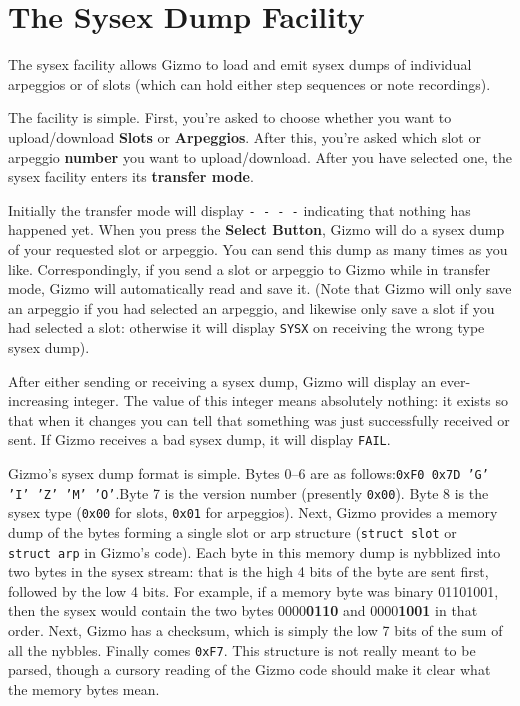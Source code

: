 \documentclass{article}
\begin{document}
\clearpage

\section {The Sysex Dump Facility}
\label{sysex}

	The sysex facility allows Gizmo to load and emit sysex dumps of individual arpeggios or of slots (which can hold either step sequences or note recordings).
	
	The facility is simple.  First, you're asked to choose whether you want to upload/download {\bf Slots} or {\bf Arpeggios}.  After this, you're asked which slot or arpeggio {\bf number} you want to upload/download.  After you have selected one, the sysex facility enters its {\bf transfer mode}.
	
Initially the transfer mode will display \texttt{-~-~-~-} indicating that nothing has happened yet.  When you press the {\bf Select Button}, Gizmo will do a sysex dump of your requested slot or arpeggio.  You can send this dump as many times as you like.  Correspondingly, if you send a slot or arpeggio to Gizmo while in transfer mode, Gizmo will automatically read and save it.  (Note that Gizmo will only save an arpeggio if you had selected an arpeggio, and likewise only save a slot if you had selected a slot: otherwise it will display \texttt{SYSX} on receiving the wrong type sysex dump).

After either sending or receiving a sysex dump, Gizmo will display an ever-increasing integer.  The value of this integer means absolutely nothing: it exists so that when it changes you can tell that something was just successfully received or sent.  If Gizmo receives a bad sysex dump, it will display \texttt{FAIL}.

Gizmo's sysex dump format is simple.  Bytes 0--6 are as follows:\quad\texttt{0xF0 0x7D 'G' 'I' 'Z' 'M' 'O'}.\quad  Byte 7 is the version number (presently \texttt{0x00}). Byte 8 is the sysex type (\texttt{0x00} for slots, \texttt{0x01} for arpeggios).  Next, Gizmo provides a memory dump of the bytes forming a single slot or arp structure (\texttt{struct~{\textunderscore}slot} or \texttt{struct~{\textunderscore}arp} in Gizmo's code).  Each byte in this memory dump is nybblized into two bytes in the sysex stream: that is the high 4 bits of the byte are sent first, followed by the low 4 bits.  For example, if a memory byte was binary 01101001, then the sysex would contain the two bytes 0000{\bf 0110} and 0000{\bf 1001} in that order.  Next, Gizmo has a checksum, which is simply the low 7 bits of the sum of all the nybbles.  Finally comes \texttt{0xF7}.   This structure is not really meant to be parsed, though a cursory reading of the Gizmo code should make it clear what the memory bytes mean.
\end{document}
